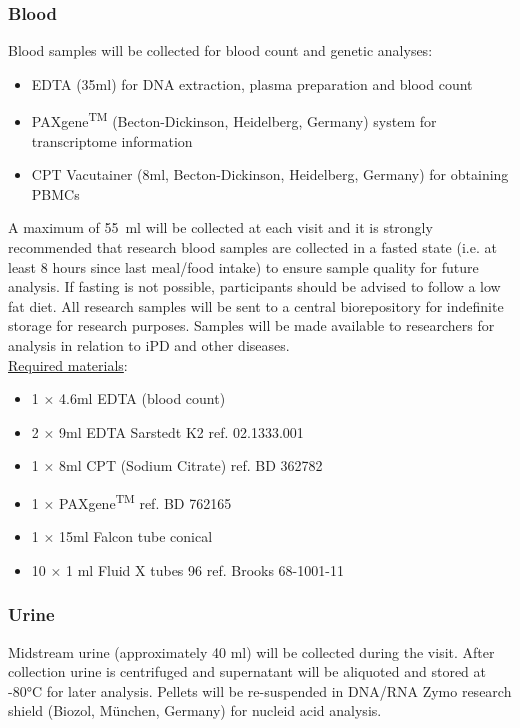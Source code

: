 \subsubsection{Blood}
\label{biosamples:blood}
Blood samples will be collected for blood count and genetic analyses:
\begin{itemize}
\item \acs{EDTA} (35ml) for \acs{DNA} extraction, plasma preparation and blood count
\item PAXgene\textsuperscript{TM} (Becton-Dickinson, Heidelberg, Germany) system
      for transcriptome information
\item \acs{CPT} Vacutainer (8ml, Becton-Dickinson, Heidelberg, Germany)
      for obtaining \acsp{PBMC}
\end{itemize}
A maximum of \SI[round-precision = 0, round-mode = places]{55}{\milli\litre} will be collected at each visit and it is strongly recommended that research blood samples are collected in a fasted state (i.e. at least 8 hours since last meal/food intake) to ensure sample quality for future analysis. If fasting is not possible, participants should be advised to follow a low fat diet. All research samples will be sent to a central biorepository for indefinite storage for research purposes. Samples will be made available to researchers for analysis in relation to \ac{iPD} and other diseases. \\

\noindent \underline{Required materials}:
\begin{itemize}
  \item 1 $\times$ 4.6ml \acs{EDTA} (blood count)
  \item 2 $\times$ 9ml \acs{EDTA} Sarstedt K2 ref. 02.1333.001 
  \item 1 $\times$ 8ml \acs{CPT} (Sodium Citrate) ref. BD 362782
  \item 1 $\times$ PAXgene\textsuperscript{TM} ref. BD 762165
  \item 1 $\times$ 15ml Falcon tube conical 
  \item 10 $\times$ 1 ml Fluid X tubes 96 ref. Brooks 68-1001-11 
\end{itemize}


\subsubsection{Urine}
\label{biosamples:urine}
Midstream urine (approximately 40 ml) will be collected during the visit. After collection urine is centrifuged and supernatant will be aliquoted and stored at -80°C for later analysis. Pellets will be re-suspended in DNA/RNA Zymo research shield (Biozol, München, Germany) for  nucleid acid analysis.

